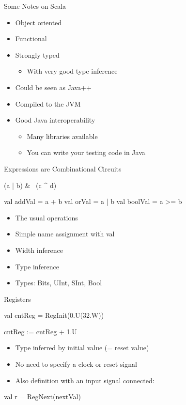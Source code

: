 \documentclass[xcolor=pdflatex,dvipsnames,table]{beamer}
\begin{document}
\begin{frame}[fragile]{Some Notes on Scala}
\begin{itemize}
\item Object oriented
\item Functional
\item Strongly typed
\begin{itemize}
\item With very good type inference
\end{itemize}
\item Could be seen as Java++
\item Compiled to the JVM
\item Good Java interoperability
\begin{itemize}
\item Many libraries available
\item You can write your testing code in Java
\end{itemize}
\end{itemize}
\end{frame}




\begin{frame}[fragile]{Expressions are Combinational Circuits}
\begin{chisel}
(a | b) & ~(c ^ d)

val addVal = a + b
val orVal = a | b
val boolVal = a >= b
\end{chisel}
\begin{itemize}
\item The usual operations 
\item Simple name assignment with val
\item Width inference
\item Type inference
\item Types: Bits, UInt, SInt, Bool
\end{itemize}
\end{frame}

\begin{frame}[fragile]{Registers}
\begin{chisel}
val cntReg = RegInit(0.U(32.W))

cntReg := cntReg + 1.U
\end{chisel}
\begin{itemize}
\item Type inferred by initial value (= reset value)
\item No need to specify a clock or reset signal
\end{itemize}
\begin{itemize}
\item Also definition with an input signal connected:
\end{itemize}
\begin{chisel}
val r = RegNext(nextVal) 
\end{chisel}
\end{frame}
\end{document}
